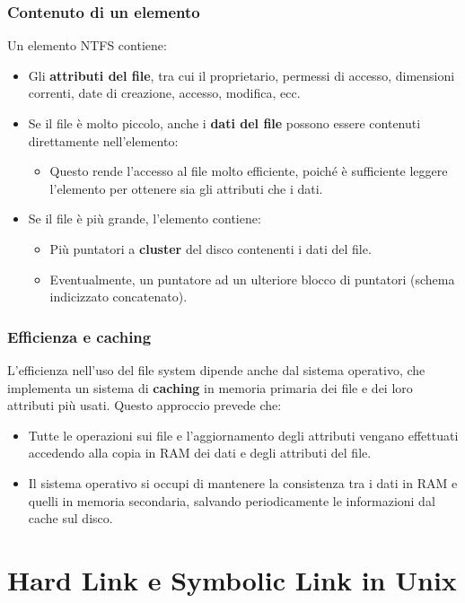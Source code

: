 \subsubsection{Contenuto di un elemento}
Un elemento NTFS contiene:
\begin{itemize}
    \item Gli \textbf{attributi del file}, tra cui il proprietario, permessi di accesso, dimensioni correnti, date di creazione, accesso, modifica, ecc.
    \item Se il file è molto piccolo, anche i \textbf{dati del file} possono essere contenuti direttamente nell’elemento:
    \begin{itemize}
        \item Questo rende l’accesso al file molto efficiente, poiché è sufficiente leggere l’elemento per ottenere sia gli attributi che i dati.
    \end{itemize}
    \item Se il file è più grande, l’elemento contiene:
    \begin{itemize}
        \item Più puntatori a \textbf{cluster} del disco contenenti i dati del file.
        \item Eventualmente, un puntatore ad un ulteriore blocco di puntatori (schema indicizzato concatenato).
    \end{itemize}
\end{itemize}

\subsubsection{Efficienza e caching}
L’efficienza nell’uso del file system dipende anche dal sistema operativo, che implementa un sistema di \textbf{caching} in memoria primaria dei file e dei loro attributi più usati. Questo approccio prevede che:
\begin{itemize}
    \item Tutte le operazioni sui file e l’aggiornamento degli attributi vengano effettuati accedendo alla copia in RAM dei dati e degli attributi del file.
    \item Il sistema operativo si occupi di mantenere la consistenza tra i dati in RAM e quelli in memoria secondaria, salvando periodicamente le informazioni dal cache sul disco.
\end{itemize}

\section{Hard Link e Symbolic Link in Unix}

